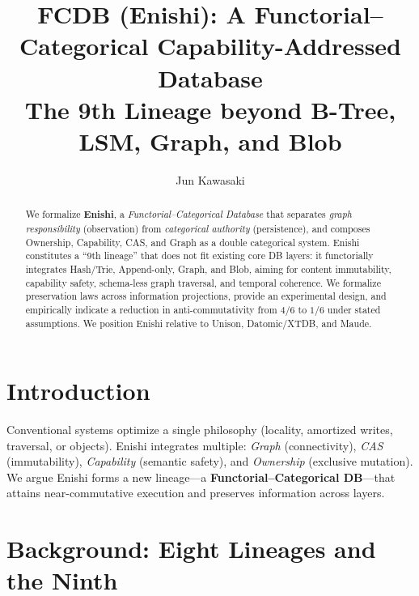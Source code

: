 \documentclass[10pt]{article}
\title{FCDB (Enishi): A Functorial–Categorical Capability-Addressed Database\\
\large The 9th Lineage beyond B-Tree, LSM, Graph, and Blob}
\author{Jun Kawasaki}
\date{}
\begin{document}
\maketitle

\begin{abstract}
We formalize \textbf{Enishi}, a \emph{Functorial--Categorical Database} that separates
\emph{graph responsibility} (observation) from \emph{categorical authority} (persistence),
and composes Ownership, Capability, CAS, and Graph as a double categorical system.
Enishi constitutes a ``9th lineage'' that does not fit existing core DB layers: it
functorially integrates Hash/Trie, Append-only, Graph, and Blob, aiming for content immutability,
capability safety, schema-less graph traversal, and temporal coherence.
We formalize preservation laws across information projections, provide an experimental design,
and empirically indicate a reduction in anti-commutativity from $4/6$ to $1/6$ under stated
assumptions. We position Enishi relative to Unison, Datomic/XTDB, and Maude.
\end{abstract}

\section{Introduction}
Conventional systems optimize a single philosophy (locality, amortized writes, traversal, or objects).
Enishi integrates multiple: \emph{Graph} (connectivity), \emph{CAS} (immutability), \emph{Capability} (semantic safety),
and \emph{Ownership} (exclusive mutation).
We argue Enishi forms a new lineage---a \textbf{Functorial--Categorical DB}---that attains near-commutative execution
and preserves information across layers.

\section{Background: Eight Lineages and the Ninth}
\end{document}
